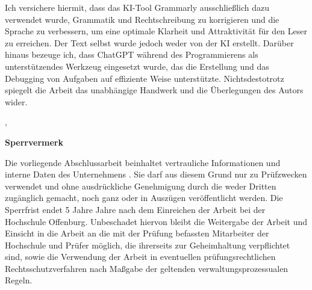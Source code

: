 Ich versichere hiermit, dass das KI-Tool Grammarly \cite{Grammarly} ausschließlich dazu verwendet wurde, Grammatik und Rechtschreibung zu korrigieren und die Sprache zu verbessern, um eine optimale Klarheit und Attraktivität für den Leser zu erreichen. Der Text selbst wurde jedoch weder von der KI erstellt. Darüber hinaus bezeuge ich, dass ChatGPT \cite{ChatGPT} während des Programmierens als unterstützendes Werkzeug eingesetzt wurde, das die Erstellung und das Debugging von Aufgaben auf effiziente Weise unterstützte. Nichtsdestotrotz spiegelt die Arbeit das unabhängige Handwerk und die Überlegungen des Autors wider.

%
{
\vspace{0.5cm}
}{}%


\vspace{1cm}
\hsmaort, \hsmadatum \\
\hsmaautor

%
{%
\vspace{5cm}
\color{red}\textsf{\large\textbf{Sperrvermerk}}

Die vorliegende Abschlussarbeit beinhaltet vertrauliche Informationen und interne Daten des Unternehmens \hsmafirma.
Sie darf aus diesem Grund nur zu Prüfzwecken verwendet und ohne ausdrückliche Genehmigung durch die \hsmafirma weder Dritten zugänglich gemacht, noch ganz oder in Auszügen veröffentlicht werden. Die Sperrfrist endet 5 Jahre Jahre nach dem Einreichen der Arbeit bei der Hochschule Offenburg. Unbeschadet hiervon bleibt die Weitergabe der Arbeit und Einsicht in die Arbeit an die mit der Prüfung befassten Mitarbeiter der Hochschule und Prüfer möglich, die ihrerseits zur Geheimhaltung verpflichtet sind, sowie die Verwendung der Arbeit in eventuellen prüfungsrechtlichen Rechtsschutzverfahren nach Maßgabe der geltenden verwaltungsprozessualen Regeln.
\color{black}
}{}

